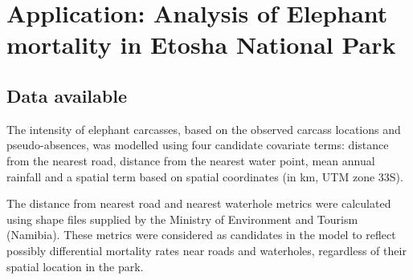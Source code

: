 \documentclass[letterpaper]{interact}
\begin{document}


\clearpage

\section{Application: Analysis of Elephant mortality in Etosha National Park}\label{analysis-of-elephant-mortality-in-etosha-national-park}

\subsection{Data available}\label{data-available}

The intensity of elephant carcasses, based on the observed carcass locations and pseudo-absences, was modelled using four candidate covariate terms: distance from the nearest road, distance from the nearest water point, mean annual rainfall and a spatial term based on spatial coordinates (in km, UTM zone 33S).

The distance from nearest road and nearest waterhole metrics were calculated using shape files supplied by the Ministry of Environment and Tourism (Namibia). These metrics were considered as candidates in the model to reflect possibly differential mortality rates near roads and waterholes, regardless of their spatial location in the park. 
\end{document}
